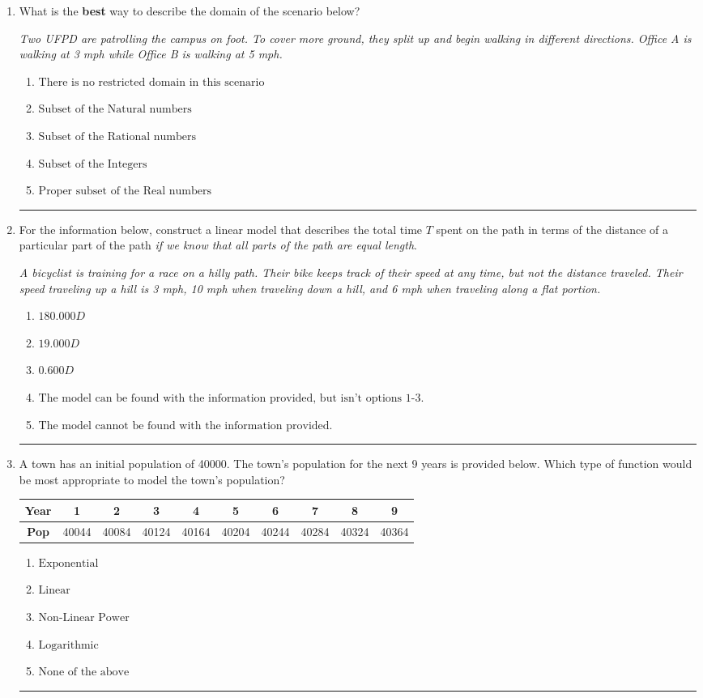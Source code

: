\documentclass[14pt]{extbook}
\newcommand{\litem}[1]{\item#1\hspace*{-1cm}\rule{\textwidth}{0.4pt}}
\begin{document}
\begin{enumerate}
{\begin{enumerate}[label=\Alph*.]
\end{enumerate} }
\litem{
What is the \textbf{best} way to describe the domain of the scenario below?
\begin{center}
    \textit{ Two UFPD are patrolling the campus on foot. To cover more ground, they split up and begin walking in different directions. Office A is walking at 3 mph while Office B is walking at 5 mph. }
\end{center}
\begin{enumerate}[label=\Alph*.]
\item \( \text{There is no restricted domain in this scenario} \)
\item \( \text{Subset of the Natural numbers} \)
\item \( \text{Subset of the Rational numbers} \)
\item \( \text{Subset of the Integers} \)
\item \( \text{Proper subset of the Real numbers} \)

\end{enumerate} }
\litem{
For the information below, construct a linear model that describes the total time $T$ spent on the path in terms of the distance of a particular part of the path \textit{if we know that all parts of the path are equal length}.
\begin{center}
    \textit{ A bicyclist is training for a race on a hilly path. Their bike keeps track of their speed at any time, but not the distance traveled. Their speed traveling up a hill is 3 mph, 10 mph when traveling down a hill, and 6 mph when traveling along a flat portion. }
\end{center}
\begin{enumerate}[label=\Alph*.]
\item \( 180.000 D \)
\item \( 19.000 D \)
\item \( 0.600 D \)
\item \( \text{The model can be found with the information provided, but isn't options 1-3.} \)
\item \( \text{The model cannot be found with the information provided.} \)

\end{enumerate} }
\litem{
A town has an initial population of 40000. The town's population for the next 9 years is provided below. Which type of function would be most appropriate to model the town's population?

\begin{tabular}{c|c|c|c|c|c|c|c|c|c}
\textbf{Year} &1 &2 &3 &4 &5 &6 &7 &8 &9\tabularnewline \hline
\textbf{Pop} &40044 &40084 &40124 &40164 &40204 &40244 &40284 &40324 &40364\end{tabular}\begin{enumerate}[label=\Alph*.]
\item \( \text{Exponential} \)
\item \( \text{Linear} \)
\item \( \text{Non-Linear Power} \)
\item \( \text{Logarithmic} \)
\item \( \text{None of the above} \)


\end{enumerate}}
\end{enumerate}
\end{document}

